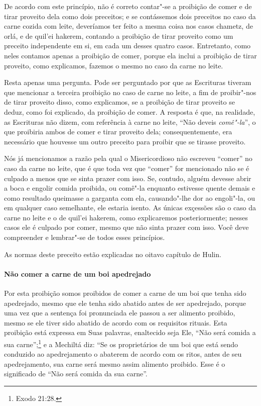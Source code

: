 \begin{multicols}{2}
De acordo com este princípio, não é correto contar"-se a proibição de
comer e de tirar proveito dela como dois preceitos; e se contássemos
dois preceitos no caso da carne cozida com leite, deveríamos ter feito a
mesma coisa nos casos chametz\starr, de
orlá\starr, e de quil'ei hakerem\starr, contando a proibição de tirar proveito
como um preceito independente em si, em cada um desses quatro casos.
Entretanto, como neles contamos apenas a proibição de comer, porque ela
inclui a proibição de tirar proveito, como explicamos, fazemos o mesmo
no caso da carne no leite.

Resta apenas uma pergunta. Pode ser perguntado por que as Escrituras
tiveram que mencionar a terceira proibição no caso de carne no leite, a
fim de proibir"-nos de tirar proveito disso, como explicamos, se a
proibição de tirar proveito se deduz, como foi explicado, da proibição
de comer. A resposta é que, na realidade, as Escrituras não dizem, com
referência à carne no leite, ``Não deveis \emph{comê"-la}'', o que
proibiria ambos de comer e tirar proveito dela; consequentemente, era
necessário que houvesse um outro preceito para proibir que se tirasse
proveito.

Nós já mencionamos a razão pela qual o Misericordioso não escreveu
``comer'' no caso da carne no leite, que é que toda vez que ``comer''
for mencionado não se é culpado a menos que se sinta prazer com isso.
Se, contudo, alguém devesse abrir a boca e engolir comida proibida, ou
comê"-la enquanto estivesse quente demais e como resultado queimasse a
garganta com ela, causando"-lhe dor ao engoli"-la, ou em qualquer caso
semelhante, ele estaria isento. As únicas exçessões são o caso da carne
no leite e o de quil'ei hakerem\starr, como explicaremos posteriormente;
nesses casos ele é culpado por comer, mesmo que não sinta prazer com
isso. Você deve compreender e lembrar"-se de todos esses princípios.

As normas deste preceito estão explicadas no oitavo capítulo de Hulin\starr.

\paragraph{Não comer a carne de um boi apedrejado}

Por esta proibição somos proibidos de comer a carne de um boi que tenha
sido apedrejado, mesmo que ele tenha sido abatido antes de ser
apedrejado, porque uma vez que a sentença foi pronunciada ele passou a
ser alimento proibido, mesmo se ele tiver sido abatido de acordo com os
requisitos rituais. Esta proibição está expressa em Suas palavras,
enaltecido seja Ele, ``Não será comida a sua carne'';\footnote{Exodo 21:28.} e a
Mechiltá\starr{} diz: ``Se os proprietários de um boi que está sendo conduzido
ao apedrejamento o abaterem de acordo com os ritos, antes de seu
apedrejamento, sua carne será mesmo assim alimento proibido. Esse é o
significado de ``Não será comida da sua carne''.


\end{multicols}
